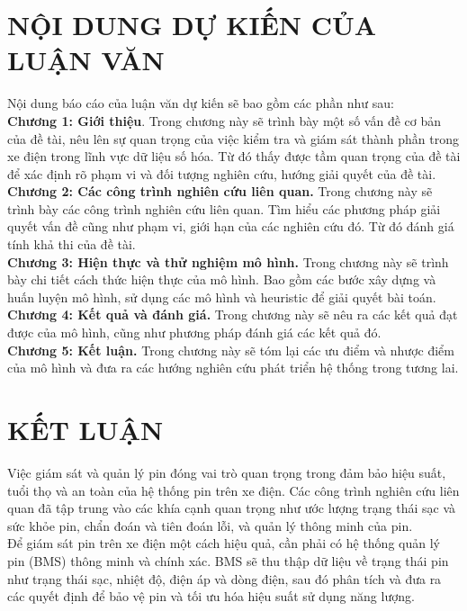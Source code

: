 \documentclass[a4paper,13pt]{article}
\theoremstyle{mytheor}
\begin{document}
\vspace{5cm}
\section{NỘI DUNG DỰ KIẾN CỦA LUẬN VĂN}

Nội dung báo cáo của luận văn dự kiến sẽ bao gồm các phần như sau:\\

\textbf{Chương 1: Giới thiệu}. Trong chương này sẽ trình bày một số vấn đề cơ bản của đề tài, nêu lên sự quan trọng của việc kiểm tra và giám sát thành phần trong xe điện trong lĩnh vực dữ liệu số hóa. Từ đó thấy được tầm quan trọng của đề tài để xác định rõ phạm vi và đối tượng nghiên cứu, hướng giải quyết của đề tài.
\\

\textbf{Chương 2: Các công trình nghiên cứu liên quan.} Trong chương này sẽ trình bày các công trình nghiên cứu liên quan. Tìm hiểu các phương pháp giải quyết vấn đề cũng như phạm vi, giới hạn của các nghiên cứu đó. Từ đó đánh giá tính khả thi của đề tài.\\

\textbf{Chương 3: Hiện thực và thử nghiệm mô hình. } Trong chương này sẽ trình bày chi tiết cách thức hiện thực của mô hình. Bao gồm các bước xây dựng và huấn luyện mô hình, sử dụng các mô hình và heuristic để giải quyết bài toán.\\

\textbf{Chương 4: Kết quả và đánh giá.} Trong chương này sẽ nêu ra các kết quả đạt được của mô hình, cũng như phương pháp đánh giá các kết quả đó.\\

\textbf{Chương 5: Kết luận.} Trong chương này sẽ tóm lại các ưu điểm và nhược điểm của mô hình và đưa ra các hướng nghiên cứu phát triển hệ thống trong tương lai.\\

\section{KẾT LUẬN}
Việc giám sát và quản lý pin đóng vai trò quan trọng trong đảm bảo hiệu suất, tuổi thọ và an toàn của hệ thống pin trên xe điện. Các công trình nghiên cứu liên quan đã tập trung vào các khía cạnh quan trọng như ước lượng trạng thái sạc và sức khỏe pin, chẩn đoán và tiên đoán lỗi, và quản lý thông minh của pin.\\

Để giám sát pin trên xe điện một cách hiệu quả, cần phải có hệ thống quản lý pin (BMS) thông minh và chính xác. BMS sẽ thu thập dữ liệu về trạng thái pin như trạng thái sạc, nhiệt độ, điện áp và dòng điện, sau đó phân tích và đưa ra các quyết định để bảo vệ pin và tối ưu hóa hiệu suất sử dụng năng lượng.\\
\end{document}
